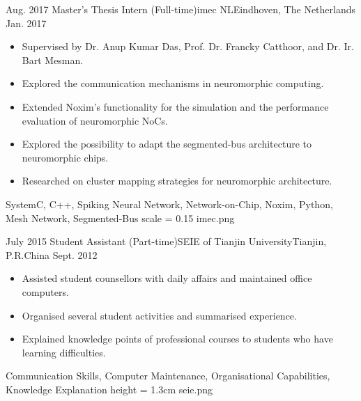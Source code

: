 \begin{experiences}
	
	\experience
    {Aug. 2017}	{Master's Thesis Intern (Full-time)}{imec NL}{Eindhoven, The Netherlands}
    {Jan. 2017}	{
    				\begin{itemize}
                    	\item Supervised by Dr. Anup Kumar Das, Prof. Dr. Francky Catthoor, and Dr. Ir. Bart Mesman.
    					\item Explored the communication mechanisms in neuromorphic computing.
                        \item Extended Noxim's functionality for the simulation and the performance evaluation of neuromorphic NoCs.
                        \item Explored the possibility to adapt the segmented-bus architecture to neuromorphic chips. 
                        \item Researched on cluster mapping strategies for neuromorphic architecture.
    				\end{itemize}
    			}
                {SystemC, C++, Spiking Neural Network, Network-on-Chip, Noxim, Python, Mesh Network, Segmented-Bus}
     {scale = 0.15}		{imec.png} 
	\emptySeparator
    
    
    \experience
    {July 2015}	{Student Assistant (Part-time)}{SEIE of Tianjin University}{Tianjin, P.R.China}
    {Sept. 2012}	{
    				\begin{itemize}
                    	\item Assisted student counsellors with daily affairs and maintained office computers. 
    					\item Organised several student activities and summarised experience.
                        \item Explained knowledge points of professional courses to students who have learning difficulties.
    				\end{itemize}
    			}
                {Communication Skills, Computer Maintenance, Organisational Capabilities, Knowledge Explanation}
     {height = 1.3cm}		{seie.png} 
    
\end{experiences}